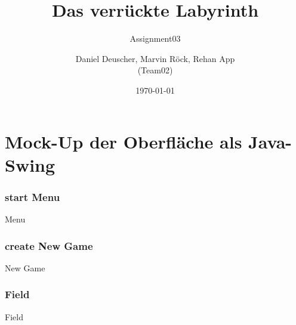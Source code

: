 \documentclass{beamer}
\begin{document}
	\title[]{Das verrückte Labyrinth}	
	\subtitle{Assignment03}
	\author{Daniel Deuscher, Marvin Röck, Rehan App\\ (Team02)}
	\date{\today}
	 
	\begin{frame}
		\maketitle
	\end{frame}
	
		\section{Mock-Up der Oberfläche als Java-Swing}
		    \label{Frame1}	
			\begin{frame}
				\frametitle{start Menu}
				\begin{block}{Menu}
				\end{block}		
			\end{frame}
		    \label{Frame2}	
			\begin{frame}
				\frametitle{create New Game}
				\begin{block}{New Game}
				\end{block}		
			\end{frame}
		    \label{Frame3}	
			\begin{frame}
				\frametitle{Field}
				\begin{block}{Field}
				\end{block}		
			\end{frame}
\end{document}
